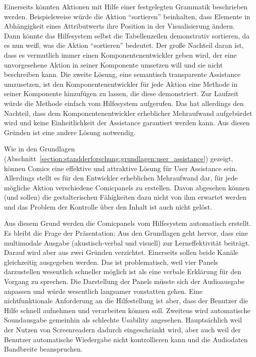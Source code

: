 \documentclass[
	headsepline,
	footsepline,
	fontsize=12pt,
	bibliography=totoc
]{scrbook}
\begin{document}
Einerseits könnten Aktionen mit Hilfe einer festgelegten Grammatik beschrieben werden. Beispielsweise würde die Aktion \enquote{sortieren} beinhalten, dass Elemente in Abhängigkeit eines Attributwerts ihre Position in der Visualisierung ändern. Dann könnte das Hilfesystem selbst die Tabellenzeilen demonstrativ sortieren, da es nun weiß, was die Aktion \enquote{sortieren} bedeutet. Der große Nachteil daran ist, dass es vermutlich immer einen Komponentenentwickler geben wird, der eine unvorgesehene Aktion in seiner Komponente umsetzen will und sie nicht beschreiben kann. Die zweite Lösung, eine semantisch transparente Assistance umzusetzen, ist den Komponentenentwickler für jede Aktion eine Methode in seiner Komponente hinzufügen zu lassen, die diese demonstriert. Zur Laufzeit würde die Methode einfach vom Hilfesystem aufgerufen. Das hat allerdings den Nachteil, dass dem Komponentenentwickler erheblicher Mehraufwand aufgebürdet wird und keine Einheitlichkeit der Assistance garantiert werden kann. Aus diesen Gründen ist eine andere Lösung notwendig.

Wie in den Grundlagen (Abschnitt~\ref{section:standderforschung:grundlagen:user_assistance}) gezeigt, können Comics eine effektive und attraktive Lösung für User Assistance sein. Allerdings stellt es für den Entwickler erheblichen Mehraufwand dar, für jede mögliche Aktion verschiedene Comicpanels zu erstellen. Davon abgesehen können (und sollen) die gestalterischen Fähigkeiten dazu nicht von ihm erwartet werden und das Problem der Kontrolle über den Inhalt ist auch nicht gelöst.

Aus diesem Grund werden die Comicpanels vom Hilfesystem automatisch erstellt. Es bleibt die Frage der Präsentation: Aus den Grundlagen geht hervor, dass eine multimodale Ausgabe (akustisch-verbal und visuell) zur Lerneffektivität beiträgt. Darauf wird aber aus zwei Gründen verzichtet. Einerseits sollen beide Kanäle gleichzeitig ausgegeben werden. Das ist problematisch, weil vier Panels darzustellen wesentlich schneller möglich ist als eine verbale Erklärung für den Vorgang zu sprechen. Die Darstellung der Panels müsste sich der Audioausgabe anpassen und würde wesentlich langsamer vonstatten gehen. Eine nichtfunktionale Anforderung an die Hilfestellung ist aber, dass der Benutzer die Hilfe schnell aufnehmen und verarbeiten können soll. Zweitens wird automatische Soundausgabe gemeinhin als schlechte Usability angesehen. Hauptsächlich weil der Nutzen von Screenreadern dadurch eingeschränkt wird, aber auch weil der Benutzer automatische Wiedergabe nicht kontrollieren kann und die Audiodaten Bandbreite beanspruchen.
\end{document}
